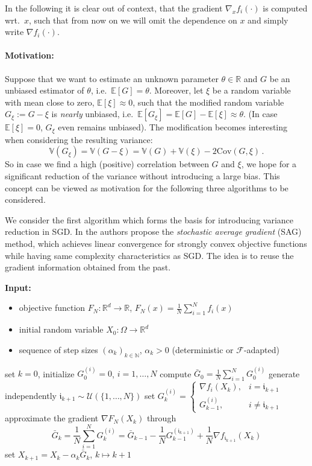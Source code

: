 \documentclass[12pt,openany]{book}
\theoremstyle{definition}
\theoremstyle{definition}
\newcommand{\E}{\mathbb{E}}
\newcommand{\N}{\mathbb{N}}
\newcommand{\R}{\mathbb{R}}
\newcommand{\V}{\mathbb{V}}
\begin{document}
In the following it is clear out of context, that the gradient $\nabla_x f_i(\cdot)$ is computed wrt.~$x$, such that from now on we will omit the dependence on $x$ and simply write $\nabla f_i(\cdot)$.

\paragraph{Motivation:}
Suppose that we want to estimate an unknown parameter $\theta\in\R$ and $G$ be an unbiased estimator of $\theta$, i.e.~$\E[G]=\theta$. Moreover, let $\xi$ be a random variable with mean close to zero, $\E[\xi]\approx 0$, such that the modified random variable $G_\xi := G-\xi$ is \textit{nearly} unbiased, i.e.~$\E[G_\xi] = \E[G]-\E[\xi]\approx \theta$. (In case $\E[\xi]=0$, $G_\xi$ even remains unbiased). The modification becomes interesting when considering the resulting variance:
\[\V(G_\xi) = \V(G-\xi) = \V(G)+\V(\xi)-2{\mathrm{Cov}}(G,\xi)\,.\]
So in case we find a high (positive) correlation between $G$ and $\xi$, we hope for a significant reduction of the variance without introducing a large bias. This concept can be viewed as motivation for the following three algorithms to be considered.\medskip

We consider the first algorithm which forms the basis for introducing variance reduction in SGD. In \cite{Schmidt2017} the authors propose the \textit{stochastic average gradient} (SAG) method, which achieves linear convergence for strongly convex objective functions while having same complexity characteristics as SGD. The idea is to reuse the gradient information obtained from the past.

\begin{algorithm}[htb!]
\begin{algorithmic}[1]
\State \textbf{Input:} \begin{itemize}
 \item objective function $F_N:\R^d\to\R$, $F_N(x) = \frac1N\sum_{i=1}^N f_i(x)$
 \item initial random variable $X_0:\Omega\to\R^d$
 \item sequence of step sizes $(\alpha_k)_{k\in\N}$, $\alpha_k>0$ (deterministic or $\mathcal F$-adapted)
 \end{itemize}
 \State set $k=0$, initialize $G_0^{(i)}=0$, $i=1,\dots,N$
 \State compute $\bar G_0 = \frac{1}{N} \sum_{i=1}^N G_0^{(i)}$
	\State generate independently $\mathfrak i_{k+1} \sim \mathcal U(\{1,\dots,N\})$
	\State set $G_k^{(i)} = \begin{cases} \nabla f_i(X_k), & i = \mathfrak i_{k+1} \\ G_{k-1}^{(i)}, & i \neq \mathfrak i_{k+1} \end{cases}$
	\State approximate the gradient $\nabla F_N(X_k)$ through
	\[\bar G_k = \frac1N\sum_{i=1}^N G_k^{(i)} = \bar G_{k-1} - \frac1N G_{k-1}^{(\mathfrak i_{k+1})} + \frac1N \nabla f_{\mathfrak i_{k+1}}(X_k) \]
	\State set $X_{k+1} = X_k -\alpha_k \bar G_k$, $k \mapsto k+1$
\EndWhile
\end{algorithmic}
 \caption{Stochastic average gradient method (SAG)}\label{alg:SAG}
\end{algorithm}
\end{document}
